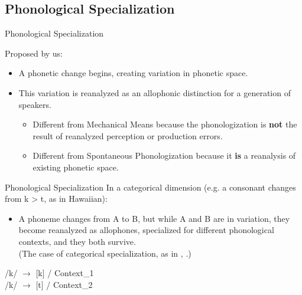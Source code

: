 \documentclass[hyperref={pdfpagelabels=false}]{beamer}
\begin{document}
\subsection{Phonological Specialization}

\begin{frame}{Phonological Specialization}

	Proposed by us: \pause
	\begin{itemize}
		\item A phonetic change begins, creating variation in phonetic space. \pause
		\item This variation is reanalyzed as an allophonic distinction for a generation of speakers. \pause
		\begin{itemize}
				\item Different from Mechanical Means because the phonologization is \textbf{not} the result of reanalyzed perception or production errors. \pause
				\item Different from Spontaneous Phonologization because it \textbf{is} a reanalysis of existing phonetic space.
		\end{itemize}
	\end{itemize}

\end{frame}

\begin{frame}{Phonological Specialization}
	In a categorical dimension (e.g. a consonant changes from k > t, as in Hawaiian):
	\begin{itemize}
		\item A phoneme changes from A to B, but while A and B are in variation, they become reanalyzed as allophones, specialized for different phonological contexts, and they both survive. \\(The case of categorical specialization, as in \citealt{kroch1994}, \citealt{fruehwaldwallenberg2013, fruehwaldwallenberginprep}.)\\
		
	\end{itemize}
	\begin{center}
		/k/ $\rightarrow$ [k] / Context_1\\
		/k/ $\rightarrow$ [t] / Context_2\\
	\end{center}

\end{frame}
\end{document}
